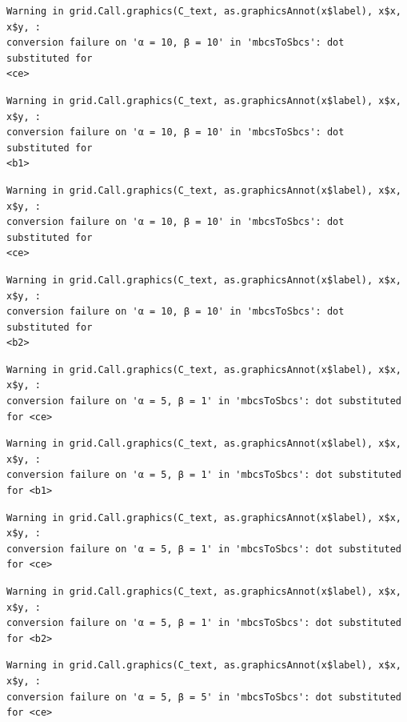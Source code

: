 \documentclass[
  spanish,
  a4paper,
]{scrreport}
\theoremstyle{plain}
\theoremstyle{definition}
\theoremstyle{definition}
\theoremstyle{remark}
\begin{document}
\begin{verbatim}
Warning in grid.Call.graphics(C_text, as.graphicsAnnot(x$label), x$x, x$y, :
conversion failure on 'α = 10, β = 10' in 'mbcsToSbcs': dot substituted for
<ce>
\end{verbatim}

\begin{verbatim}
Warning in grid.Call.graphics(C_text, as.graphicsAnnot(x$label), x$x, x$y, :
conversion failure on 'α = 10, β = 10' in 'mbcsToSbcs': dot substituted for
<b1>
\end{verbatim}

\begin{verbatim}
Warning in grid.Call.graphics(C_text, as.graphicsAnnot(x$label), x$x, x$y, :
conversion failure on 'α = 10, β = 10' in 'mbcsToSbcs': dot substituted for
<ce>
\end{verbatim}

\begin{verbatim}
Warning in grid.Call.graphics(C_text, as.graphicsAnnot(x$label), x$x, x$y, :
conversion failure on 'α = 10, β = 10' in 'mbcsToSbcs': dot substituted for
<b2>
\end{verbatim}

\begin{verbatim}
Warning in grid.Call.graphics(C_text, as.graphicsAnnot(x$label), x$x, x$y, :
conversion failure on 'α = 5, β = 1' in 'mbcsToSbcs': dot substituted for <ce>
\end{verbatim}

\begin{verbatim}
Warning in grid.Call.graphics(C_text, as.graphicsAnnot(x$label), x$x, x$y, :
conversion failure on 'α = 5, β = 1' in 'mbcsToSbcs': dot substituted for <b1>
\end{verbatim}

\begin{verbatim}
Warning in grid.Call.graphics(C_text, as.graphicsAnnot(x$label), x$x, x$y, :
conversion failure on 'α = 5, β = 1' in 'mbcsToSbcs': dot substituted for <ce>
\end{verbatim}

\begin{verbatim}
Warning in grid.Call.graphics(C_text, as.graphicsAnnot(x$label), x$x, x$y, :
conversion failure on 'α = 5, β = 1' in 'mbcsToSbcs': dot substituted for <b2>
\end{verbatim}

\begin{verbatim}
Warning in grid.Call.graphics(C_text, as.graphicsAnnot(x$label), x$x, x$y, :
conversion failure on 'α = 5, β = 5' in 'mbcsToSbcs': dot substituted for <ce>
\end{verbatim}
\end{document}

